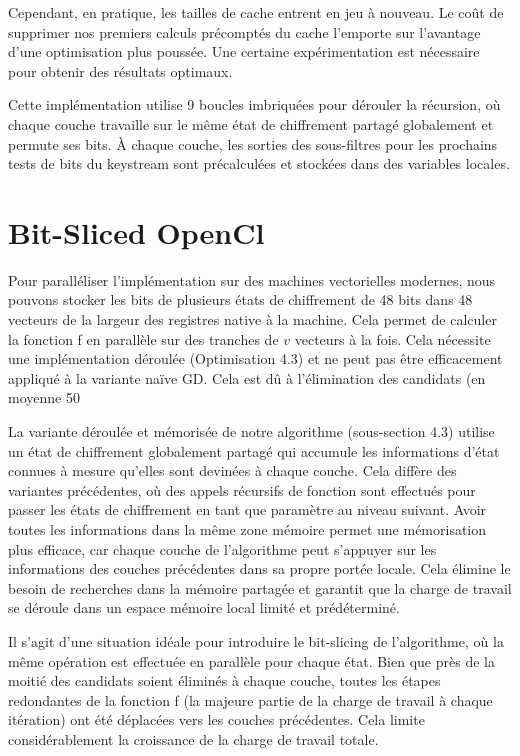\documentclass{template}
\begin{document}
Cependant, en pratique, les tailles de cache entrent en jeu à nouveau. Le coût de supprimer nos premiers calculs précomptés du cache l'emporte sur l'avantage d'une optimisation plus poussée. Une certaine expérimentation est nécessaire pour obtenir des résultats optimaux.

Cette implémentation utilise 9 boucles imbriquées pour dérouler la récursion, où chaque couche travaille sur le même état de chiffrement partagé globalement et permute ses bits. À chaque couche, les sorties des sous-filtres pour les prochains tests de bits du keystream sont précalculées et stockées dans des variables locales.
\section{Bit-Sliced OpenCl}
\baselineskip=16pt
Pour paralléliser l'implémentation sur des machines vectorielles modernes, nous pouvons stocker les bits de plusieurs états de chiffrement de 48 bits dans 48 vecteurs de la largeur des registres native à la machine. Cela permet de calculer la fonction f en parallèle sur des tranches de $v$ vecteurs à la fois. Cela nécessite une implémentation déroulée (Optimisation 4.3) et ne peut pas être efficacement appliqué à la variante naïve GD. Cela est dû à l'élimination des candidats (en moyenne 50 %

La variante déroulée et mémorisée de notre algorithme (sous-section 4.3) utilise un état de chiffrement globalement partagé qui accumule les informations d'état connues à mesure qu'elles sont devinées à chaque couche. Cela diffère des variantes précédentes, où des appels récursifs de fonction sont effectués pour passer les états de chiffrement en tant que paramètre au niveau suivant. Avoir toutes les informations dans la même zone mémoire permet une mémorisation plus efficace, car chaque couche de l'algorithme peut s'appuyer sur les informations des couches précédentes dans sa propre portée locale. Cela élimine le besoin de recherches dans la mémoire partagée et garantit que la charge de travail se déroule dans un espace mémoire local limité et prédéterminé.

Il s'agit d'une situation idéale pour introduire le bit-slicing de l'algorithme, où la même opération est effectuée en parallèle pour chaque état. Bien que près de la moitié des candidats soient éliminés à chaque couche, toutes les étapes redondantes de la fonction f (la majeure partie de la charge de travail à chaque itération) ont été déplacées vers les couches précédentes. Cela limite considérablement la croissance de la charge de travail totale.
\end{document}
